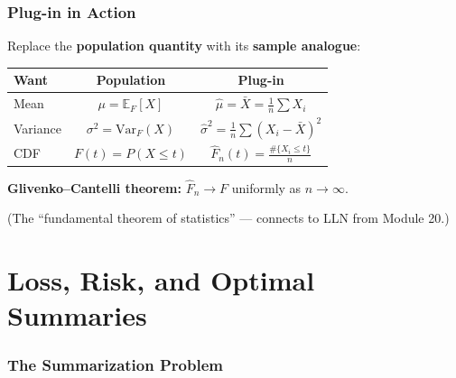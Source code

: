\documentclass[aspectratio=169]{beamer}
\begin{document}
\begin{frame}
\frametitle{Plug-in in Action}

Replace the \textbf{population quantity} with its \textbf{sample analogue}:

\vspace{0.5cm}
\renewcommand{\arraystretch}{1.8}
\begin{center}
\begin{tabular}{lcc}
  \textbf{Want} & \textbf{Population} & \textbf{Plug-in} \\
  \hline
  Mean & $\mu = \mathbb{E}_F[X]$ & $\hat{\mu} = \bar{X} = \frac{1}{n}\sum X_i$ \\[4pt]
  Variance & $\sigma^2 = \text{Var}_F(X)$ & $\hat{\sigma}^2 = \frac{1}{n}\sum (X_i - \bar{X})^2$ \\[4pt]
  CDF & $F(t) = P(X \le t)$ & $\hat{F}_n(t) = \frac{\#\{X_i \le t\}}{n}$ \\
  \hline
\end{tabular}
\end{center}

\vspace{0.4cm}
\textbf{Glivenko--Cantelli theorem:} $\hat{F}_n \to F$ uniformly as $n \to \infty$.

\small (The ``fundamental theorem of statistics'' --- connects to LLN from Module 20.)
\end{frame}

\section{Loss, Risk, and Optimal Summaries}

\begin{frame}
\frametitle{The Summarization Problem}

\begin{center}
\end{center}
\end{frame}
\end{document}
